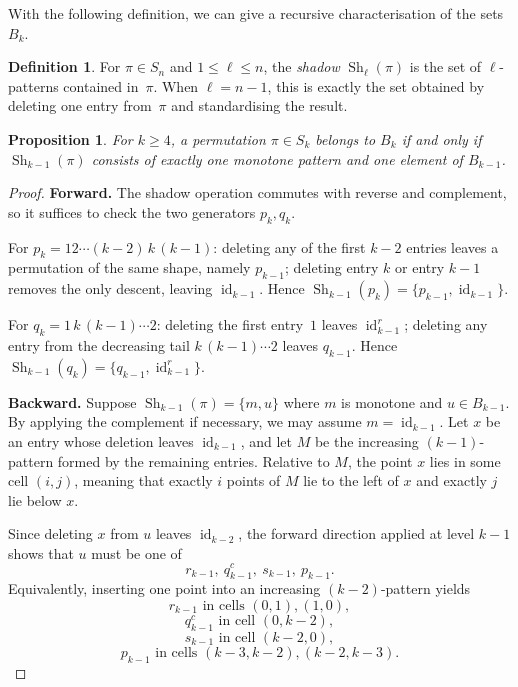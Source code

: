\documentclass[11pt]{amsart}
\newcommand{\Sym}{S}
\newcommand{\Sh}{\operatorname{Sh}}
\newcommand{\id}{\operatorname{id}}
\theoremstyle{plain}
\newtheorem{proposition}[theorem]{Proposition}
\theoremstyle{definition}
\newtheorem{definition}[theorem]{Definition}
\theoremstyle{remark}
\begin{document}
With the following definition, we can give a recursive characterisation of the sets $B_k$.
\begin{definition}
  For $\pi \in \Sym_n$ and $1 \leq \ell \leq n$, the \emph{shadow} $\Sh_\ell(\pi)$ is the set of
  $\ell$-patterns contained in~$\pi$.  When $\ell=n-1$, this is exactly the set obtained by
  deleting one entry from~$\pi$ and standardising the result.
\end{definition}

\begin{proposition}\label{prop:recursive-Bk}
  For $k \geq 4$, a permutation $\pi \in \Sym_k$ belongs to $B_k$ if and only if
  $\Sh_{k-1}(\pi)$ consists of exactly one monotone pattern and one element of $B_{k-1}$.
\end{proposition}

\begin{proof}
  \textbf{Forward.}  The shadow operation commutes with reverse and complement, so
  it suffices to check the two generators $p_k, q_k$.

  For $p_k = 12\cdots(k{-}2)\,k\,(k{-}1)$: deleting any of the first $k-2$ entries leaves a
  permutation of the same shape, namely $p_{k-1}$; deleting entry $k$ or entry $k-1$ removes the
  only descent, leaving $\id_{k-1}$.  Hence
  $\Sh_{k-1}(p_k) = \{p_{k-1}, \id_{k-1}\}$.

  For $q_k = 1\,k\,(k{-}1)\cdots 2$: deleting the first entry~$1$ leaves
  $\id_{k-1}^r$; deleting any entry from the decreasing tail $k\,(k{-}1)\cdots 2$ leaves $q_{k-1}$.
  Hence $\Sh_{k-1}(q_k) = \{q_{k-1}, \id_{k-1}^r\}$.

  \medskip\noindent
  \textbf{Backward.}  Suppose $\Sh_{k-1}(\pi) = \{m, u\}$ where $m$ is monotone and
  $u \in B_{k-1}$.  By applying the complement if necessary, we may assume $m = \id_{k-1}$.
  Let $x$ be an entry whose deletion leaves $\id_{k-1}$, and let $M$ be the increasing
  $(k-1)$-pattern formed by the remaining entries.  Relative to $M$, the point $x$ lies in some cell
  $(i,j)$, meaning that exactly $i$ points of $M$ lie to the left of $x$ and exactly $j$ lie below
  $x$.

  Since deleting $x$ from $u$ leaves $\id_{k-2}$, the forward direction applied at level $k-1$
  shows that $u$ must be one of
  \[
    r_{k-1},\ q_{k-1}^c,\ s_{k-1},\ p_{k-1}.
  \]
  Equivalently, inserting one point into an increasing $(k-2)$-pattern yields
  \[
    r_{k-1}\text{ in cells }(0,1),(1,0),
  \]
  \[
    q_{k-1}^c\text{ in cell }(0,k-2),
  \]
  \[
    s_{k-1}\text{ in cell }(k-2,0),
  \]
  \[
    p_{k-1}\text{ in cells }(k-3,k-2),(k-2,k-3).
  \]


\end{proof}
\end{document}
